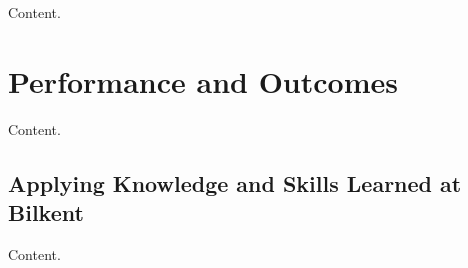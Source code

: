 \documentclass[10pt]{article}
\begin{document}

Content.

\section{Performance and Outcomes}

Content.

\subsection{Applying Knowledge and Skills Learned at Bilkent}


Content.
\end{document}

